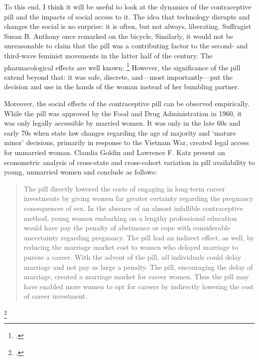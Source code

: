 \documentclass[letterpaper,notitlepage,12pt]{article}
\begin{document}
To this end, I think it will be useful to look at the dynamics of the
contraceptive pill and the impacts of social access to it.
The idea that technology disrupts and changes the social is no surprise: it is
often, but not always, liberating.
Suffragist Susan B. Anthony once remarked on the bicycle, 
Similarly, it would not be unreasonable to claim that the pill was a
contributing factor to the second- and third-wave feminist movements in the
latter half of the  century. The pharmacological effects are well known:
\footcite[p.
731]{goldin_power_2002} However, the significance of the pill extend beyond that:
it was safe, discrete, and---most importantly---put the decision and use in the 
hands of the woman instead of her bumbling partner.

Moreover, the social effects of the contraceptive pill can be observed
empirically.
While the pill was approved by the Food and Drug Administration in 1960, it was
only legally accessible by married women.
It was only in the late 60s and early 70s when state law changes regarding the
age of majority and `mature minor' decisions, primarily in response to the
Vietnam War, created legal access for unmarried woman.
Claudia Goldin and Lawrence F. Katz present an econometric analysis of
cross-state and cross-cohort variation in pill availability to young, unmarried
women and conclude as follows:
\blockquote{The pill directly lowered the costs of engaging in long-term career
  investments by giving women far greater certainty regarding the pregnancy
consequences of sex. In the absence of an almost infallible contraceptive
method, young women embarking on a lengthy professional education would have pay
the penalty of abstinence or cope with considerable uncertainty regarding
pregnancy. The pill had an indirect effect, as well, by reducing the marriage
market cost to women who delayed marriage to pursue a career. With the advent of
the pill, \textit{all} individuals could delay marriage and not pay as large a
penalty. The pill, encouraging the delay of marriage, created a
 marriage market for career women. Thus the pill may have
enabled more women to opt for careers by indirectly lowering the cost of career
investment.}\footcite[p. 731]{goldin_power_2002}
\end{document}
